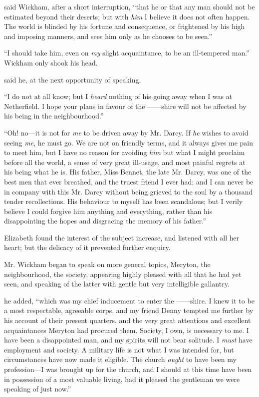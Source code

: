  said Wickham, after a short interruption, “that he or that any man should not be estimated beyond their deserts; but with {\em him} I believe it does not often happen. The world is blinded by his fortune and consequence, or frightened by his high and imposing manners, and sees him only as he chooses to be seen.”

“I should take him, even on {\em my} slight acquaintance, to be an ill-tempered man.” Wickham only shook his head.

 said he, at the next opportunity of speaking, 

“I do not at all know; but I {\em heard} nothing of his going away when I was at Netherfield. I hope your plans in favour of the ------shire will not be affected by his being in the neighbourhood.”

“Oh! no---it is not for {\em me} to be driven away by Mr. Darcy. If {\em he} wishes to avoid seeing {\em me}, he must go. We are not on friendly terms, and it always gives me pain to meet him, but I have no reason for avoiding {\em him} but what I might proclaim before all the world, a sense of very great ill-usage, and most painful regrets at his being what he is. His father, Miss Bennet, the late Mr. Darcy, was one of the best men that ever breathed, and the truest friend I ever had; and I can never be in company with this Mr. Darcy without being grieved to the soul by a thousand tender recollections. His behaviour to myself has been scandalous; but I verily believe I could forgive him anything and everything, rather than his disappointing the hopes and disgracing the memory of his father.”

Elizabeth found the interest of the subject increase, and listened with all her heart; but the delicacy of it prevented further enquiry.

Mr. Wickham began to speak on more general topics, Meryton, the neighbourhood, the society, appearing highly pleased with all that he had yet seen, and speaking of the latter with gentle but very intelligible gallantry.

 he added, “which was my chief inducement to enter the ------shire. I knew it to be a most respectable, agreeable corps, and my friend Denny tempted me further by his account of their present quarters, and the very great attentions and excellent acquaintances Meryton had procured them. Society, I own, is necessary to me. I have been a disappointed man, and my spirits will not bear solitude. I {\em must} have employment and society. A military life is not what I was intended for, but circumstances have now made it eligible. The church {\em ought} to have been my profession---I was brought up for the church, and I should at this time have been in possession of a most valuable living, had it pleased the gentleman we were speaking of just now.”

